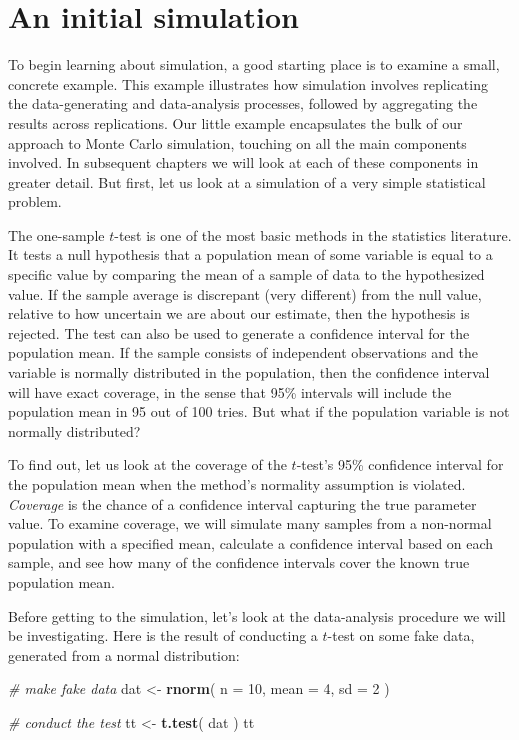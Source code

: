 \documentclass[
]{book}
\newenvironment{Shaded}{\begin{snugshade}}{\end{snugshade}}
\newcommand{\AttributeTok}[1]{\textcolor[rgb]{0.13,0.29,0.53}{#1}}
\newcommand{\CommentTok}[1]{\textcolor[rgb]{0.56,0.35,0.01}{\textit{#1}}}
\newcommand{\DecValTok}[1]{\textcolor[rgb]{0.00,0.00,0.81}{#1}}
\newcommand{\FunctionTok}[1]{\textcolor[rgb]{0.13,0.29,0.53}{\textbf{#1}}}
\newcommand{\NormalTok}[1]{#1}
\newcommand{\OtherTok}[1]{\textcolor[rgb]{0.56,0.35,0.01}{#1}}
\begin{document}
\chapter{An initial simulation}\label{t-test-simulation}

To begin learning about simulation, a good starting place is to examine a small, concrete example.
This example illustrates how simulation involves replicating the data-generating and data-analysis processes, followed by aggregating the results across replications.
Our little example encapsulates the bulk of our approach to Monte Carlo simulation, touching on all the main components involved.
In subsequent chapters we will look at each of these components in greater detail.
But first, let us look at a simulation of a very simple statistical problem.

The one-sample \(t\)-test is one of the most basic methods in the statistics literature.
It tests a null hypothesis that a population mean of some variable is equal to a specific value by comparing the mean of a sample of data to the hypothesized value.
If the sample average is discrepant (very different) from the null value, relative to how uncertain we are about our estimate, then the hypothesis is rejected.
The test can also be used to generate a confidence interval for the population mean.
If the sample consists of independent observations and the variable is normally distributed in the population, then the confidence interval will have exact coverage, in the sense that 95\% intervals will include the population mean in 95 out of 100 tries.
But what if the population variable is not normally distributed?

To find out, let us look at the coverage of the \(t\)-test's 95\% confidence interval for the population mean when the method's normality assumption is violated.
\emph{Coverage} is the chance of a confidence interval capturing the true parameter value.
To examine coverage, we will simulate many samples from a non-normal population with a specified mean, calculate a confidence interval based on each sample, and see how many of the confidence intervals cover the known true population mean.

Before getting to the simulation, let's look at the data-analysis procedure we will be investigating.
Here is the result of conducting a \(t\)-test on some fake data, generated from a normal distribution:

\begin{Shaded}
\begin{Highlighting}[]
\CommentTok{\# make fake data}
\NormalTok{dat }\OtherTok{\textless{}{-}} \FunctionTok{rnorm}\NormalTok{( }\AttributeTok{n =} \DecValTok{10}\NormalTok{, }\AttributeTok{mean =} \DecValTok{4}\NormalTok{, }\AttributeTok{sd =} \DecValTok{2}\NormalTok{ )}

\CommentTok{\# conduct the test}
\NormalTok{tt }\OtherTok{\textless{}{-}} \FunctionTok{t.test}\NormalTok{( dat )}
\NormalTok{tt}
\end{Highlighting}
\end{Shaded}
\end{document}
